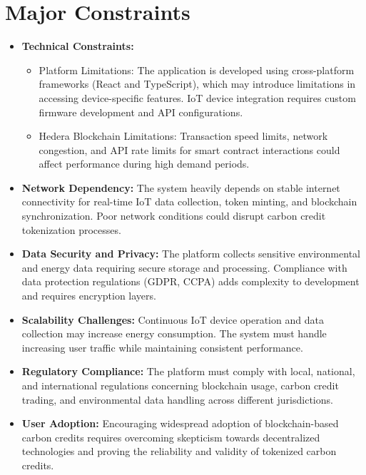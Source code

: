 \documentclass[oneside,a4paper,12pt]{book}
\begin{document}
\section{Major Constraints}
\begin{itemize}
\item \textbf{Technical Constraints:}
\begin{itemize}
\item Platform Limitations: The application is developed using cross-platform frameworks (React and TypeScript), which may introduce limitations in accessing device-specific features. IoT device integration requires custom firmware development and API configurations.
\item Hedera Blockchain Limitations: Transaction speed limits, network congestion, and API rate limits for smart contract interactions could affect performance during high demand periods.
\end{itemize}

\item \textbf{Network Dependency:} The system heavily depends on stable internet connectivity for real-time IoT data collection, token minting, and blockchain synchronization. Poor network conditions could disrupt carbon credit tokenization processes.

\item \textbf{Data Security and Privacy:} The platform collects sensitive environmental and energy data requiring secure storage and processing. Compliance with data protection regulations (GDPR, CCPA) adds complexity to development and requires encryption layers.

\item \textbf{Scalability Challenges:} Continuous IoT device operation and data collection may increase energy consumption. The system must handle increasing user traffic while maintaining consistent performance.

\item \textbf{Regulatory Compliance:} The platform must comply with local, national, and international regulations concerning blockchain usage, carbon credit trading, and environmental data handling across different jurisdictions.

\item \textbf{User Adoption:} Encouraging widespread adoption of blockchain-based carbon credits requires overcoming skepticism towards decentralized technologies and proving the reliability and validity of tokenized carbon credits.
\end{itemize}
\end{document}
